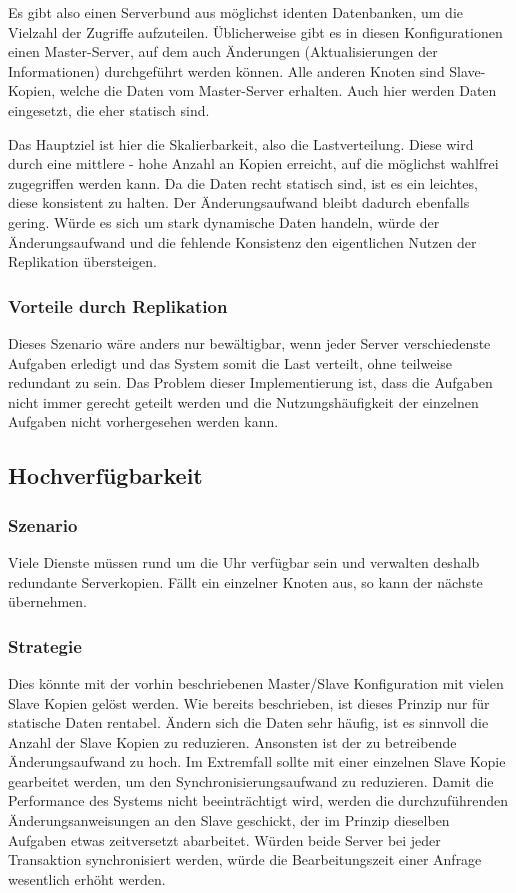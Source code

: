 Es gibt also einen Serverbund aus möglichst identen Datenbanken, um die Vielzahl der Zugriffe aufzuteilen. Üblicherweise gibt es in diesen Konfigurationen einen Master-Server, auf dem auch Änderungen (Aktualisierungen der Informationen) durchgeführt werden können. Alle anderen Knoten sind Slave-Kopien, welche die Daten vom Master-Server erhalten. Auch hier werden Daten eingesetzt, die eher statisch sind.

Das Hauptziel ist hier die Skalierbarkeit, also die Lastverteilung. Diese wird durch eine mittlere - hohe Anzahl an Kopien erreicht, auf die möglichst wahlfrei zugegriffen werden kann. Da die Daten recht statisch sind, ist es ein leichtes, diese konsistent zu halten. Der Änderungsaufwand bleibt dadurch ebenfalls gering. Würde es sich um stark dynamische Daten handeln, würde der Änderungsaufwand und die fehlende Konsistenz den eigentlichen Nutzen der Replikation übersteigen.

\subsubsection{Vorteile durch Replikation}

Dieses Szenario wäre anders nur bewältigbar, wenn jeder Server verschiedenste Aufgaben erledigt und das System somit die Last verteilt, ohne teilweise redundant zu sein. Das Problem dieser Implementierung ist, dass die Aufgaben nicht immer gerecht geteilt werden und die Nutzungshäufigkeit der einzelnen Aufgaben nicht vorhergesehen werden kann.

\subsection{Hochverfügbarkeit}

\subsubsection{Szenario}

Viele Dienste müssen rund um die Uhr verfügbar sein und verwalten deshalb redundante Serverkopien. Fällt ein einzelner Knoten aus, so kann der nächste übernehmen.

\subsubsection{Strategie}

Dies könnte mit der vorhin beschriebenen Master/Slave Konfiguration mit vielen Slave Kopien gelöst werden. Wie bereits beschrieben, ist dieses Prinzip nur für statische Daten rentabel. Ändern sich die Daten sehr häufig, ist es sinnvoll die Anzahl der Slave Kopien zu reduzieren. Ansonsten ist der zu betreibende Änderungsaufwand zu hoch. Im Extremfall sollte mit einer einzelnen Slave Kopie gearbeitet werden, um den Synchronisierungsaufwand zu reduzieren. \cite{kaiserslautern} Damit die Performance des Systems nicht beeinträchtigt wird, werden die durchzuführenden Änderungsanweisungen an den Slave geschickt, der im Prinzip dieselben Aufgaben etwas zeitversetzt abarbeitet. Würden beide Server bei jeder Transaktion synchronisiert werden, würde die Bearbeitungszeit einer Anfrage wesentlich erhöht werden.

